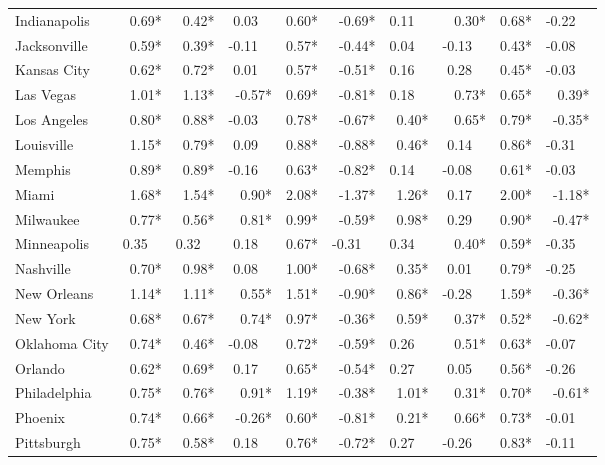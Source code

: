 \begin{tabular}{lrrrrrrrrr}
	Indianapolis   &  0.69* &   0.42* &  0.03~~ &   0.60* &  -0.69* &  0.11~~ &   0.30* &   0.68* & -0.22~~ \\
	Jacksonville   &  0.59* &   0.39* & -0.11~~ &   0.57* &  -0.44* &  0.04~~ & -0.13~~ &   0.43* & -0.08~~ \\
	Kansas City    &  0.62* &   0.72* &  0.01~~ &   0.57* &  -0.51* &  0.16~~ &  0.28~~ &   0.45* & -0.03~~ \\
	Las Vegas      &  1.01* &   1.13* &  -0.57* &   0.69* &  -0.81* &  0.18~~ &   0.73* &   0.65* &   0.39* \\
	Los Angeles    &  0.80* &   0.88* & -0.03~~ &   0.78* &  -0.67* &   0.40* &   0.65* &   0.79* &  -0.35* \\
	Louisville     &  1.15* &   0.79* &  0.09~~ &   0.88* &  -0.88* &   0.46* &  0.14~~ &   0.86* & -0.31~~ \\
	Memphis        &  0.89* &   0.89* & -0.16~~ &   0.63* &  -0.82* &  0.14~~ & -0.08~~ &   0.61* & -0.03~~ \\
	Miami          &  1.68* &   1.54* &   0.90* &   2.08* &  -1.37* &   1.26* &  0.17~~ &   2.00* &  -1.18* \\
	Milwaukee      &  0.77* &   0.56* &   0.81* &   0.99* &  -0.59* &   0.98* &  0.29~~ &   0.90* &  -0.47* \\
	Minneapolis    & 0.35~~ &  0.32~~ &  0.18~~ &   0.67* & -0.31~~ &  0.34~~ &   0.40* &   0.59* & -0.35~~ \\
	Nashville      &  0.70* &   0.98* &  0.08~~ &   1.00* &  -0.68* &   0.35* &  0.01~~ &   0.79* & -0.25~~ \\
	New Orleans    &  1.14* &   1.11* &   0.55* &   1.51* &  -0.90* &   0.86* & -0.28~~ &   1.59* &  -0.36* \\
	New York       &  0.68* &   0.67* &   0.74* &   0.97* &  -0.36* &   0.59* &   0.37* &   0.52* &  -0.62* \\
	Oklahoma City  &  0.74* &   0.46* & -0.08~~ &   0.72* &  -0.59* &  0.26~~ &   0.51* &   0.63* & -0.07~~ \\
	Orlando        &  0.62* &   0.69* &  0.17~~ &   0.65* &  -0.54* &  0.27~~ &  0.05~~ &   0.56* & -0.26~~ \\
	Philadelphia   &  0.75* &   0.76* &   0.91* &   1.19* &  -0.38* &   1.01* &   0.31* &   0.70* &  -0.61* \\
	Phoenix        &  0.74* &   0.66* &  -0.26* &   0.60* &  -0.81* &   0.21* &   0.66* &   0.73* & -0.01~~ \\
	Pittsburgh     &  0.75* &   0.58* &  0.18~~ &   0.76* &  -0.72* &  0.27~~ & -0.26~~ &   0.83* & -0.11~~ \\

\end{tabular}
